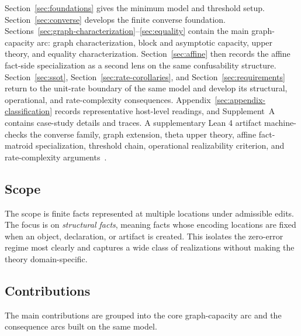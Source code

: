 Section~\ref{sec:foundations} gives the minimum model and threshold setup. Section~\ref{sec:converse} develops the finite converse foundation. Sections~\ref{sec:graph-characterization}--\ref{sec:equality} contain the main graph-capacity arc: graph characterization, block and asymptotic capacity, upper theory, and equality characterization. Section~\ref{sec:affine} then records the affine fact-side specialization as a second lens on the same confusability structure. Section~\ref{sec:ssot}, Section~\ref{sec:rate-corollaries}, and Section~\ref{sec:requirements} return to the unit-rate boundary of the same model and develop its structural, operational, and rate-complexity consequences. Appendix~\ref{sec:appendix-classification} records representative host-level readings, and Supplement~A contains case-study details and traces. A supplementary Lean 4 artifact machine-checks the converse family, graph extension, theta upper theory, affine fact-matroid specialization, threshold chain, operational realizability criterion, and rate-complexity arguments~\cite{demoura2021lean4}.

\subsection{Scope}\label{sec:scope}

The scope is finite facts represented at multiple locations under admissible edits. The focus is on \emph{structural facts}, meaning facts whose encoding locations are fixed when an object, declaration, or artifact is created. This isolates the zero-error regime most clearly and captures a wide class of realizations without making the theory domain-specific.

\subsection{Contributions}\label{sec:contributions}

The main contributions are grouped into the core graph-capacity arc and the consequence arcs built on the same model.
